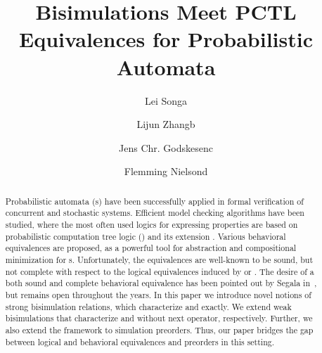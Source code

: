\documentclass{LMCS}
\begin{document}
\title[Bisimulations Meet PCTL Equivalences for Probabilistic Automata]{Bisimulations Meet PCTL Equivalences for Probabilistic Automata\rsuper*}

\author[L.~Song]{Lei Song\rsuper a}	\address{{\lsuper a}Max-Planck-Institut f\"{u}r Informatik, and
Saarland University -- Computer Science, Germany}	   

\author[L.~Zhang]{Lijun Zhang\rsuper b}	\address{{\lsuper b}State Key Laboratory of Computer Science, Institute of Software, Chinese Academy of Sciences,
DTU Informatics,  Technical University of Denmark, and
Saarland University -- Computer Science, Germany}	   

\author[J. C. Godskesen]{Jens Chr. Godskesen\rsuper c}	\address{{\lsuper c}IT University of Copenhagen, Denmark}	   

\author[F. Nielson]{Flemming Nielson\rsuper d}	\address{{\lsuper d}DTU Compute,  Technical University of Denmark}	  



\begin{abstract}
  Probabilistic automata (s) have been successfully applied in
  formal verification of concurrent and stochastic systems. Efficient
  model checking algorithms have been studied, where the most often
  used logics for expressing properties are based on probabilistic computation tree logic () and its
  extension . Various behavioral equivalences are proposed,
  as a powerful tool for abstraction and compositional minimization
  for s. Unfortunately, the equivalences are
  well-known to be sound, but not complete with respect to the logical
  equivalences induced by  or .  The desire of a
  both sound and complete behavioral equivalence has been pointed
  out by Segala in~\cite{Segala-thesis}, but remains open throughout
  the years.  In this paper we introduce novel notions
  of strong bisimulation relations, which characterize  and
   exactly. We extend weak bisimulations that characterize 
  and  without next operator, respectively.  Further, we
  also extend the framework to simulation preorders. Thus, our paper bridges
  the gap between logical and behavioral equivalences and preorders in this setting.
\end{abstract}
\maketitle
\end{document}
